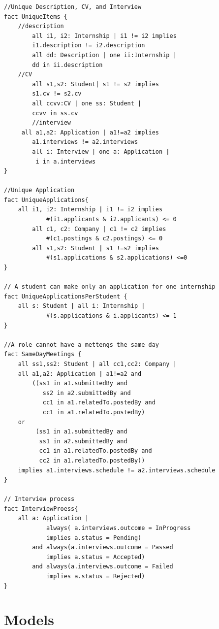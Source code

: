 \begin{lstlisting}
//Unique Description, CV, and Interview 
fact UniqueItems {
	//description
    	all i1, i2: Internship | i1 != i2 implies
   		i1.description != i2.description
    	all dd: Description | one ii:Internship | 
		dd in ii.description
	//CV
    	all s1,s2: Student| s1 != s2 implies
		s1.cv != s2.cv
    	all ccvv:CV | one ss: Student |  
		ccvv in ss.cv
    	//interview
   	 all a1,a2: Application | a1!=a2 implies 
   		a1.interviews != a2.interviews
    	all i: Interview | one a: Application |
		 i in a.interviews
}

//Unique Application
fact UniqueApplications{
	all i1, i2: Internship | i1 != i2 implies 
    		#(i1.applicants & i2.applicants) <= 0
    	all c1, c2: Company | c1 != c2 implies 
    		#(c1.postings & c2.postings) <= 0
    	all s1,s2: Student | s1 !=s2 implies 
    		#(s1.applications & s2.applications) <=0
}

// A student can make only an application for one internship
fact UniqueApplicationsPerStudent {
	all s: Student | all i: Internship | 
    		#(s.applications & i.applicants) <= 1
}

//A role cannot have a mettengs the same day
fact SameDayMeetings {
	all ss1,ss2: Student | all cc1,cc2: Company |
   	all a1,a2: Application | a1!=a2 and
   		((ss1 in a1.submittedBy and 
		   ss2 in a2.submittedBy and
   		   cc1 in a1.relatedTo.postedBy and
		   cc1 in a1.relatedTo.postedBy)
   	or
   		 (ss1 in a1.submittedBy and 
		  ss1 in a2.submittedBy and
   		  cc1 in a1.relatedTo.postedBy and 
		  cc2 in a1.relatedTo.postedBy))
   	implies a1.interviews.schedule != a2.interviews.schedule
}

// Interview process
fact InterviewProess{ 
	all a: Application | 
        	always( a.interviews.outcome = InProgress 
			implies a.status = Pending)
	 	and always(a.interviews.outcome = Passed 
			implies a.status = Accepted)
		and always(a.interviews.outcome = Failed 
			implies a.status = Rejected)
}

\end{lstlisting}


\pagebreak
\section{ Models}
